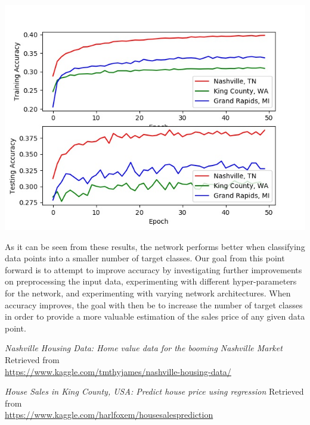 \documentclass[10pt]{article}
\begin{document}
\begin{multicols}{2}
\begin{center}
			\label{fig:fig_nn_results_5}
		\end{center}
		\begin{center}
            \captionsetup{type=figure}
			\includegraphics[scale=0.38]{NeuralNet/nn_10_class_results} \\
			\label{fig:fig_nn_results_10}
		\end{center}
		As it can be seen from these results, the network performs better when classifying data points into a smaller number of target classes. Our goal from this point forward is to attempt to improve accuracy by investigating further improvements on preprocessing the input data, experimenting with different hyper-parameters for the network, and experimenting with varying network architectures. When accuracy improves, the goal with then be to increase the number of target classes in order to provide a more valuable estimation of the sales price of any given data point.
		\begin{thebibliography}{13}
			\textit{Nashville Housing Data: Home value data for the booming Nashville Market}
			Retrieved from \\ \small{\url{https://www.kaggle.com/tmthyjames/nashville-housing-data/}}
			
			\textit{House Sales in King County, USA: Predict house price using regression}
			Retrieved from \\ \small{\url{https://www.kaggle.com/harlfoxem/housesalesprediction}}	
			

\end{thebibliography}
\end{multicols}
\end{document}
